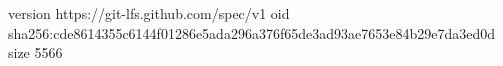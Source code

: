 version https://git-lfs.github.com/spec/v1
oid sha256:cde8614355c6144f01286e5ada296a376f65de3ad93ae7653e84b29e7da3ed0d
size 5566

